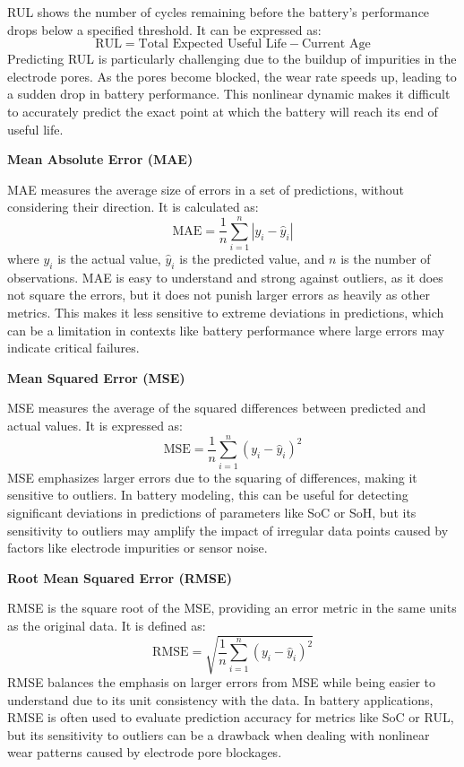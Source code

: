 RUL shows the number of cycles remaining before the battery's performance drops below a specified threshold. It can be expressed as:
\begin{equation}
\text{RUL} = \text{Total Expected Useful Life} - \text{Current Age}
\end{equation}
Predicting RUL is particularly challenging due to the buildup of impurities in the electrode pores. As the pores become blocked, the wear rate speeds up, leading to a sudden drop in battery performance. This nonlinear dynamic makes it difficult to accurately predict the exact point at which the battery will reach its end of useful life.

\vspace{1cm}

\textbf{Mean Absolute Error (MAE)}

MAE measures the average size of errors in a set of predictions, without considering their direction. It is calculated as:
\begin{equation}
\text{MAE} = \frac{1}{n} \sum_{i=1}^{n} |y_i - \hat{y}_i|
\end{equation}
where $y_i$ is the actual value, $\hat{y}_i$ is the predicted value, and $n$ is the number of observations. MAE is easy to understand and strong against outliers, as it does not square the errors, but it does not punish larger errors as heavily as other metrics. This makes it less sensitive to extreme deviations in predictions, which can be a limitation in contexts like battery performance where large errors may indicate critical failures.

\vspace{1cm}
\textbf{Mean Squared Error (MSE)}

MSE measures the average of the squared differences between predicted and actual values. It is expressed as:
\begin{equation}
\text{MSE} = \frac{1}{n} \sum_{i=1}^{n} (y_i - \hat{y}_i)^2
\end{equation}
MSE emphasizes larger errors due to the squaring of differences, making it sensitive to outliers. In battery modeling, this can be useful for detecting significant deviations in predictions of parameters like SoC or SoH, but its sensitivity to outliers may amplify the impact of irregular data points caused by factors like electrode impurities or sensor noise.


\vspace{1cm}
\textbf{Root Mean Squared Error (RMSE)}

RMSE is the square root of the MSE, providing an error metric in the same units as the original data. It is defined as:
\begin{equation}
\text{RMSE} = \sqrt{\frac{1}{n} \sum_{i=1}^{n} (y_i - \hat{y}_i)^2}
\end{equation}
RMSE balances the emphasis on larger errors from MSE while being easier to understand due to its unit consistency with the data. In battery applications, RMSE is often used to evaluate prediction accuracy for metrics like SoC or RUL, but its sensitivity to outliers can be a drawback when dealing with nonlinear wear patterns caused by electrode pore blockages.


